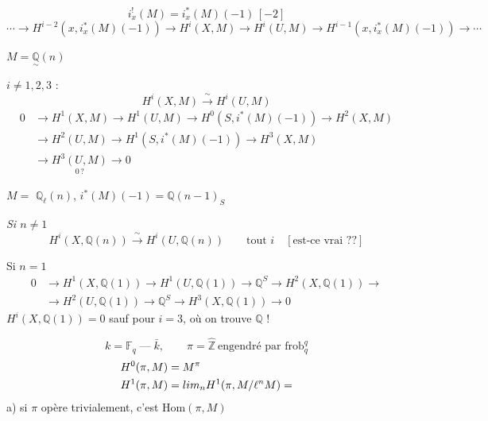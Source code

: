 \documentclass[11pt,a4paper]{article}
\begin{document}


\[
  i_{x}^{!}(M) = i_{x}^{*}(M)(-1)\,[-2]
\]
\[
  \cdots \to H^{i-2}(x, i_{x}^{*}(M)(-1)) \to H^{i}(X, M) \to H^{i}(U, M) \to
  H^{i-1}(x, i_{x}^{*}(M)(-1)) \to \cdots
\]


$M = \underset{\sim}{\mathbb{Q}}(n)$


 $i \neq 1, 2, 3$ :
\[
  H^{i}(X, M) \xrightarrow{\ \sim\ } H^{i}(U, M)
\]
\[
\begin{aligned}
  0 &\to H^{1}(X, M) \to H^{1}(U, M) \to H^{0}(S, i^{*}(M)(-1)) \to H^{2}(X, M) \\
  &\to H^{2}(U, M) \to H^{1}(S, i^{*}(M)(-1)) \to H^{3}(X, M) \\
  &\to \underset{0\,?}{H^{3}(U, M)} \to 0
\end{aligned}
\]

$M =$  $\mathbb{Q}_{\ell}(n)$, $i^{*}(M)(-1) =
\mathbb{Q}(n-1)_{S}$


\emph{Si $n \neq 1$}
\[
  H^{i}(X, \mathbb{Q}(n)) \xrightarrow{\ \sim\ } H^{i}(U, \mathbb{Q}(n))
  \qquad \text{tout } i \quad [\text{est-ce vrai ??}]
\]

Si $n = 1$
\[
\begin{aligned}
  0 &\to H^{1}(X, \mathbb{Q}(1)) \to H^{1}(U, \mathbb{Q}(1)) \to \mathbb{Q}^{S} \to H^{2}(X, \mathbb{Q}(1)) \to \\
  &\to H^{2}(U, \mathbb{Q}(1)) \to \mathbb{Q}^{S} \to H^{3}(X, \mathbb{Q}(1)) \to 0
\end{aligned}
\]
$H^{i}(X, \mathbb{Q}(1)) = 0$ sauf pour $i = 3$, où on trouve $\mathbb{Q}$ !


\[
  k = \mathbb{F}_{q} \;\text{---}\; \bar{k}, \qquad \pi = \hat{\mathbb{Z}}
  \ \text{engendré par } \mathrm{frob}^{q}_{q}
\]
\[
\begin{aligned}
  H^{0}(\pi, M) &= M^{\pi} \\
  H^{1}(\pi, M) &= \varprojlim_{n} H^{1}(\pi, M/\ell^{n}M) =
\end{aligned}
\]
a) si $\pi$ opère trivialement, c'est $\mathrm{Hom}(\pi, M)$
\end{document}
